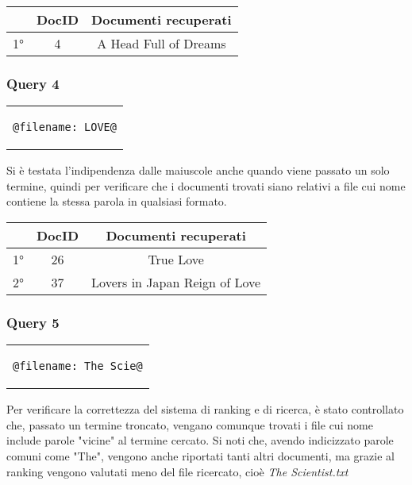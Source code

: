 \documentclass{article}
\begin{document}
\begin{table}[h!]
\centering
    \begin{tabular}{|c|c|c|}
    \hline
    & DocID & Documenti recuperati\\
    \hline
    1° & 4 & A Head Full of Dreams\\
    \hline
\end{tabular}
\end{table}

\subsubsection{Query 4}
\begin{center}
\begin{tabular}{c}
\begin{lstlisting}[style=prompt]
    @filename: LOVE@
\end{lstlisting}
\end{tabular}    
\end{center}
Si è testata l'indipendenza dalle maiuscole anche quando viene passato un solo termine, quindi per verificare che i documenti trovati siano relativi a file cui nome contiene la stessa parola in qualsiasi formato.

\begin{table}[h!]
\centering
    \begin{tabular}{|c|c|c|}
    \hline
    & DocID & Documenti recuperati\\
    \hline
    1° & 26 & True Love\\
    \hline
    2° & 37 & Lovers in Japan Reign of Love\\
    \hline
\end{tabular}
\end{table}

\subsubsection{Query 5}
\begin{center}
\begin{tabular}{c}
\begin{lstlisting}[style=prompt]
    @filename: The Scie@
\end{lstlisting}
\end{tabular}    
\end{center}
Per verificare la correttezza del sistema di ranking e di ricerca, è stato controllato che, passato un termine troncato, vengano comunque trovati i file cui nome include parole "vicine" al termine cercato. Si noti che, avendo indicizzato parole comuni come "The", vengono anche riportati tanti altri documenti, ma grazie al ranking vengono valutati meno del file ricercato, cioè \textit{The Scientist.txt}
\end{document}

